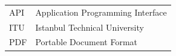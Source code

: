 \begin{tabular}{ll}
API & Application Programming Interface\\
ITU & Istanbul Technical University\\
PDF & Portable Document Format\\
\end{tabular}
